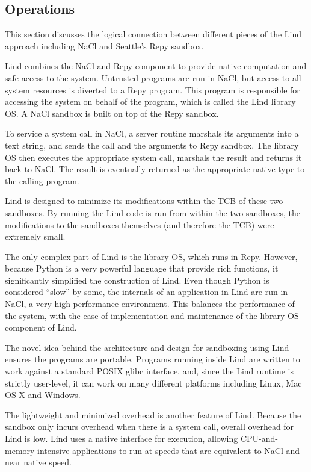 \subsection{Operations}

This section discusses the logical connection between different pieces of the Lind approach including NaCl and Seattle's Repy sandbox.

Lind combines the NaCl and Repy component to provide native computation and 
safe access to the system. Untrusted programs are run in NaCl, 
but access to all system resources is diverted to a Repy program. 
This program is responsible for accessing the system on behalf of the program, 
which is called the Lind library OS. A NaCl sandbox is built on top of the Repy sandbox. 

To service a system call in NaCl, a server routine marshals its arguments into a text string, 
and sends the call and the arguments to Repy sandbox. 
The library OS then executes the appropriate system call, marshals the result and 
returns it back to NaCl. The result is eventually returned as the appropriate native type to the calling program. 

Lind is designed to minimize its modifications within the TCB of these two sandboxes. 
By running the Lind code is run from within the two sandboxes, 
the modifications to the sandboxes themselves (and therefore the TCB) were extremely small. 

The only complex part of Lind is the library OS, which runs in Repy. 
However, because Python is a very powerful language that provide rich functions, 
it significantly simplified the construction of Lind. Even though Python is considered ``slow'' by some, 
the internals of an application in Lind are run in NaCl, a very high performance environment. 
This balances the performance of the system, with the ease of implementation and maintenance 
of the library OS component of Lind. 

The novel idea behind the architecture and design for sandboxing using Lind ensures the programs are portable. 
Programs running inside Lind are written to work against a standard POSIX glibc interface, 
and, since the Lind runtime is strictly user-level, it can work on many different platforms 
including Linux, Mac OS X and Windows.

The lightweight and minimized overhead is another feature of Lind. Because the sandbox only incurs overhead when there is a system call, 
overall overhead for Lind is low. Lind uses a native interface for execution, 
allowing CPU-and-memory-intensive applications to run at speeds that are equivalent to NaCl and near native speed. 

